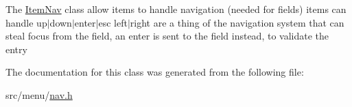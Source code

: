 The \hyperlink{classItemNav}{Item\+Nav} class allow items to handle navigation (needed for fields) items can handle up$\vert$down$\vert$enter$\vert$esc left$\vert$right are a thing of the navigation system that can steal focus from the field, an enter is sent to the field instead, to validate the entry 

The documentation for this class was generated from the following file\+:\begin{DoxyCompactItemize}
\item 
src/menu/\hyperlink{nav_8h}{nav.\+h}\end{DoxyCompactItemize}
